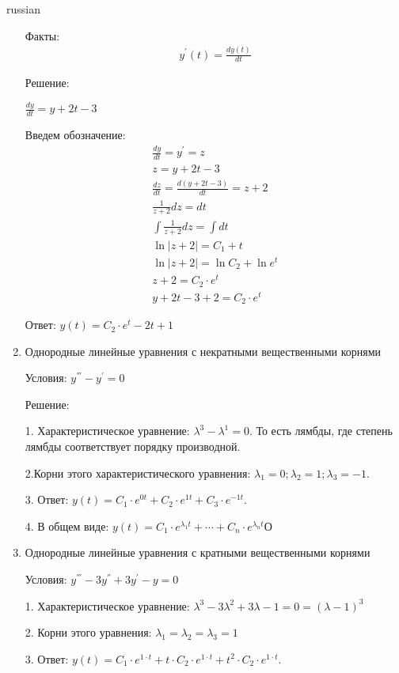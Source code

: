 \documentclass{article}
\begin{document}
\begin{otherlanguage*}{russian}
\begin{enumerate}
Факты:
\begin{align}
y^{'} (t) = \frac{dy(t)}{dt}
\end{align}

Решение: 

$\frac{dy}{dt} = y + 2t - 3$

Введем обозначение:
\begin{align}
\frac{dy}{dt}= y^{'} = z \\
z = y + 2 t - 3 \\
\frac{dz}{dt} = \frac{d(y + 2 t - 3)}{dt} = z + 2 \\
\frac{1}{z + 2} dz = dt \\
\int \frac{1}{z + 2 } dz = \int dt \\
\ln |z + 2 | = C_1 + t \\
\ln | z + 2 | = \ln C_2 + \ln e^t \\
z + 2 = C_2 \cdot e^t \\
y + 2t - 3 + 2 = C_2 \cdot e ^ t 
\end{align}

Ответ: $y(t) = C_2 \cdot e^t - 2 t + 1 $

\item Однородные линейные уравнения с некратными вещественными корнями

Условия:
$ y^ {'''} - y^{'} = 0 $

Решение:

1. Характеристическое уравнение: $ \lambda ^ 3 - \lambda^1 = 0 $. То есть лямбды, где степень лямбды соответствует порядку производной. 

2.Корни этого характеристического уравнения: $ \lambda_1 = 0; \lambda_2 = 1; \lambda_3 = - 1$. 

3. Ответ: $y(t) = C_1 \cdot e^{0t} + C_2 \cdot e^{1t} + C_3 \cdot e^{-1t} $. 

4. В общем виде: $y(t) = C_1 \cdot e ^ {\lambda_1 t} + \cdots + C_n \cdot e ^ {\lambda_n t} $О
\item Однородные линейные уравнения с кратными вещественными корнями

Условия: 
$y^{'''} - 3 y^{''} + 3 y ^{'} - y = 0 $

1. Характеристическое уравнение: $\lambda^3 - 3 \lambda ^2 + 3 \lambda - 1 = 0 = (\lambda - 1)^3 $

2. Корни этого уравнения: $ \lambda_1 = \lambda_2 = \lambda_3 = 1$

3. Ответ: $y(t) = C_1 \cdot e ^{1 \cdot t} + t \cdot C_2 \cdot e^{1\cdot t} + t ^ 2 \cdot C_2 \cdot e^{1 \cdot t} $.  


\end{enumerate}
\end{otherlanguage*}
\end{document}
